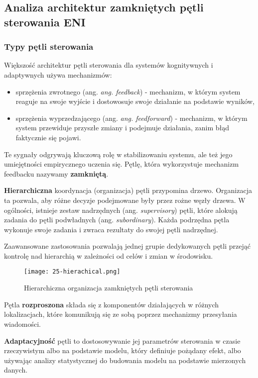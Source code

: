 \subsection{Analiza architektur zamkniętych pętli sterowania ENI}\hypertarget{sec:25}{}

\subsubsection{Typy pętli sterowania}

Większość architektur pętli sterowania dla systemów kognitywnych i adaptywnych używa mechanizmów:
\begin{itemize}
    \item sprzężenia zwrotnego (ang. \textit{ang. feedback}) - mechanizm, w którym system reaguje na swoje wyjście i dostowosuje swoje działanie na podstawie wyników,
    \item sprzężenia wyprzedzającego (ang. \textit{ang. feedforward}) - mechanizm, w którym system przewiduje przyszłe zmiany i podejmuje działania, zanim błąd faktycznie się pojawi.
\end{itemize}

Te sygnały odgrywają kluczową rolę w stabilizowaniu systemu, ale też jego umiejętności empirycznego uczenia się. Pętlę, która wykorzystuje mechanizm feedbacku nazywamy \textbf{zamkniętą}.

\textbf{Hierarchiczna} koordynacja (organizacja) pętli przypomina drzewo. Organizacja ta pozwala, aby różne decyzje podejmowane były przez rożne węzły drzewa. W ogólności, istnieje zestaw nadrzędnych (ang. \textit{supervisory}) pętli, które alokują zadania do pętli podwładnych (ang. \textit{subordinary}). Każda podrzędna pętla wykonuje swoje zadania i zwraca rezultaty do swojej pętli nadrzędnej. 

Zaawansowane zastosowania pozwalają jednej grupie dedykowanych pętli przejąć kontrolę nad hierarchią w zależności od celów i zmian w środowisku. 


\begin{figure}[!h]
    \centering \texttt{[image: 25-hierachical.png]}
    \caption{Hierarchiczna organizacja zamkniętych pętli sterowania}\label{fig:25-hierachical}
\end{figure}

Pętla \textbf{rozproszona} składa się z komponentów działających w różnych lokalizacjach, które komunikują się ze sobą poprzez mechanizmy przesyłania wiadomości. 

\textbf{Adaptacyjność} pętli to dostosowywanie jej parametrów sterowania w czasie rzeczywistym albo na podstawie modelu, który definiuje pożądany efekt, albo używając analizy statystycznej do budowania modelu na podstawie mierzonych danych.

